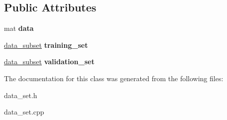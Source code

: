 \subsection*{Public Attributes}
\begin{DoxyCompactItemize}
\item 
\hypertarget{classData__set_a444ea0fda470430466122ccdbfc42c2b}{mat {\bfseries data}}\label{classData__set_a444ea0fda470430466122ccdbfc42c2b}

\item 
\hypertarget{classData__set_acb89adb39b0cdac43c7aa3f64223088d}{\hyperlink{structdata__subset}{data\-\_\-subset} {\bfseries training\-\_\-set}}\label{classData__set_acb89adb39b0cdac43c7aa3f64223088d}

\item 
\hypertarget{classData__set_a4ca480f137e45afbdefae9e6ec14aa9e}{\hyperlink{structdata__subset}{data\-\_\-subset} {\bfseries validation\-\_\-set}}\label{classData__set_a4ca480f137e45afbdefae9e6ec14aa9e}

\end{DoxyCompactItemize}


The documentation for this class was generated from the following files\-:\begin{DoxyCompactItemize}
\item 
data\-\_\-set.\-h\item 
data\-\_\-set.\-cpp\end{DoxyCompactItemize}
